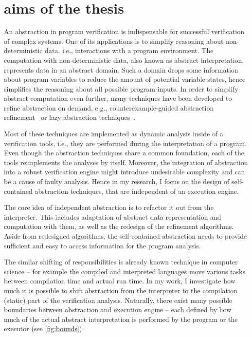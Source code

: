 \chapter{aims of the thesis}
\label{ch:aim}


An abstraction in program verification is indispensable for successful
verification of complex systems. One of its applications is to simplify
reasoning about non-deterministic data, i.e., interactions with a program
environment. The computation with non-de\-ter\-mi\-nistic data, also known as
abstract interpretation, represents data in an abstract domain. Such a domain
drops some information about program variables to reduce the amount of
potential variable states, hence simplifies the reasoning about all possible
program inputs. In order to simplify abstract computation even further, many
techniques have been developed to refine abstraction on demand, e.g.,
counterexample-guided abstraction refinement~\cite{Clarke2000} or lazy abstraction
techniques~\cite{Henzinger2002}.

Most of these techniques are implemented as dynamic analysis inside of a
verification tools, i.e., they are performed during the interpretation of a
program. Even though the abstraction techniques share a common foundation, each
of the tools reimplements the analyses by itself. Moreover, the integration of
abstraction into a robust verification engine might introduce undesirable
complexity and can be a cause of faulty analysis. Hence in my research, I focus
on the design of self-contained abstraction techniques, that are independent of
an execution engine.

The core idea of independent abstraction is to refactor it out from the
interpreter.  This includes adaptation of abstract data representation and
computation with them, as well as the redesign of the refinement algorithms.
Aside from redesigned algorithms, the self-contained abstraction needs to
provide sufficient and easy to access information for the program analysis.

The similar shifting of responsibilities is already known technique in
computer science -- for example the compiled and interpreted languages move
various tasks between compilation time and actual run time. In my work, I
investigate how much it is possible to shift abstraction from the interpreter to
the compilation (static) part of the verification analysis. Naturally, there
exist many possible boundaries between abstraction and execution engine -- each
defined by how much of the actual abstract interpretation is performed by the
program or the executor (see \autoref{fig:bounds}).

